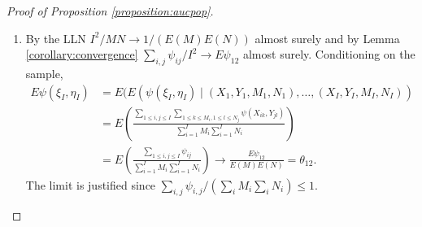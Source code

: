 \documentclass[12pt]{article}
\DeclareMathOperator{\AUC}{AUC}
\newcommand{\I}{I}
\newcommand{\E}{E}
\newcommand{\cind}{\perp \!\!\! \perp}
\newcommand{\aucpop}{\theta_{12}}%
\newcommand{\kernel}{\psi}
\newcommand{\Kernel}{\psi}
\begin{document}









  \begin{proof}[Proof of Proposition \ref{proposition:aucpop}]
    \begin{enumerate}
    \item By the LLN $\I^2/MN \to 1/(\E (M)\E (N))$ almost surely and by Lemma \ref{corollary:convergence} $\sum_{i,j}\Kernel_{ij}/\I^2 \to \E \Kernel_{12}$ almost surely. Conditioning on the sample,
      \begin{align}
        \E \kernel(\xi_\I,\eta_\I) &= \E( \E (\kernel(\xi_\I,\eta_\I) \mid (X_1,Y_1,M_1,N_1),\ldots,(X_\I,Y_\I,M_\I,N_\I))\\
                                   &= \E\left(\frac
                                     {\sum_{1\le i,j\le\I}\sum_{1\le k\le M_i,1\le l\le N_j}\kernel(X_{ik},Y_{jl})}
                                     {\sum_{i=1}^\I M_i \sum_{i=1}^\I N_i} \right)\\
                                   &= \E\left(\frac{\sum_{1\le i,j\le\I}\Kernel_{ij}}{\sum_{i=1}^\I M_i \sum_{i=1}^\I N_i} \right) \to \frac{\E\Kernel_{12}}{\E (M) \E (N)}=\aucpop.
      \end{align}
      The limit is justified since $\sum_{i,j}\psi_{i,j}/(\sum_i M_i\sum_i N_i)\le 1$. %


\end{enumerate}
\end{proof}
\end{document}
